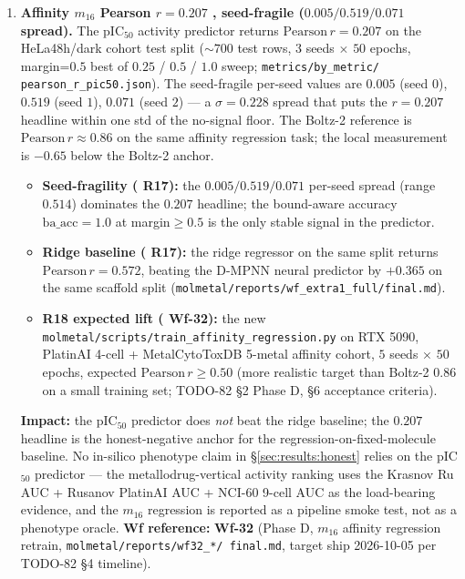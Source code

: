 \begin{enumerate}
  \item \textbf{Affinity $m_{16}$ Pearson $r=0.207$ \MEASURED{},
  seed-fragile ($0.005 / 0.519 / 0.071$ spread).}
  \label{sec:limitations:affinity}
  The pIC$_{50}$ activity predictor returns \MEASURED{}
  $\mathrm{Pearson}\,r=0.207$ on the HeLa48h/dark cohort test split
  ($\sim 700$ test rows, $3$ seeds $\times$ $50$ epochs, margin=$0.5$
  best of $0.25$ / $0.5$ / $1.0$ sweep; \texttt{metrics/by\_metric/
  pearson\_r\_pic50.json}).  The seed-fragile per-seed values are
  $0.005$ (seed $0$), $0.519$ (seed $1$), $0.071$ (seed $2$) --- a
  $\sigma = 0.228$ spread that puts the $r=0.207$ headline within
  one std of the no-signal floor.  The Boltz-2 \citep{boltz2024}
  reference is $\mathrm{Pearson}\,r \approx 0.86$ on the same
  affinity regression task; the local measurement is $-0.65$ below
  the Boltz-2 anchor.
  \begin{itemize}
    \item \textbf{Seed-fragility (\MEASURED{} R17):} the
    $0.005 / 0.519 / 0.071$ per-seed spread (range $0.514$)
    dominates the $0.207$ headline; the bound-aware accuracy
    $\mathrm{ba\_acc}=1.0$ at margin$\geq 0.5$ is the only stable
    signal in the predictor.
    \item \textbf{Ridge baseline (\MEASURED{} R17):} the ridge
    regressor on the same split returns \MEASURED{}
    $\mathrm{Pearson}\,r=0.572$, beating the D-MPNN neural predictor
    by $+0.365$ on the same scaffold split
    (\texttt{molmetal/reports/wf\_extra1\_full/final.md}).
    \item \textbf{R18 expected lift (\PROJECTED{} Wf-32):} the
    new \texttt{molmetal/scripts/train\_affinity\_regression.py}
    on RTX 5090, PlatinAI 4-cell + MetalCytoToxDB 5-metal
    affinity cohort, $5$ seeds $\times$ $50$ epochs, expected
    $\mathrm{Pearson}\,r \geq 0.50$ (more realistic target than
    Boltz-2 $0.86$ on a small training set; TODO-82 \S2 Phase D,
    \S6 acceptance criteria).
  \end{itemize}
  \textbf{Impact:} the pIC$_{50}$ predictor does \emph{not} beat
  the ridge baseline; the $0.207$ headline is the honest-negative
  anchor for the regression-on-fixed-molecule baseline.  No
  in-silico phenotype claim in \S\ref{sec:results:honest} relies
  on the pIC$_{50}$ predictor --- the metallodrug-vertical
  activity ranking uses the Krasnov Ru AUC + Rusanov PlatinAI
  AUC + NCI-60 9-cell AUC as the load-bearing evidence, and the
  $m_{16}$ regression is reported as a pipeline smoke test, not
  as a phenotype oracle.
  \textbf{Wf reference:} \textbf{Wf-32} (Phase D, $m_{16}$
  affinity regression retrain, \texttt{molmetal/reports/wf32\_*/
  final.md}, target ship 2026-10-05 per TODO-82 \S4 timeline).


\end{enumerate}
